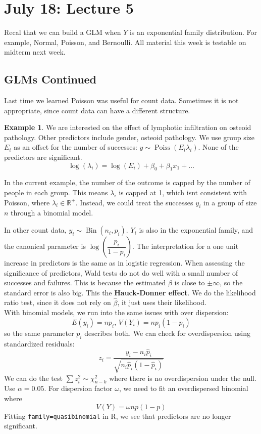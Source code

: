 \documentclass[12pt, a4paper]{article}
\theoremstyle{definition}
\newtheorem{example}{Example}
\newcommand{\R}{\mathbb{R}}                           %
\newcommand{\lam}{\lambda}
\newcommand{\f}{\frac}
\newcommand{\df}{\dfrac}
\newcommand{\BB}[1]{\left(#1\right)}
\newcommand{\op}[1]{\operatorname{#1}}
\begin{document}
	\section{July 18: Lecture 5}
	
	Recal that we can build a GLM when $Y$ is an exponential family distribution. For example, Normal, Poisson, and Bernoulli. All material this week is testable on midterm next week.
	
	\subsection{GLMs Continued}
	
	Last time we learned Poisson was useful for count data. Sometimes it is not appropriate, since count data can have a different structure.
	
	\begin{example}
		We are interested on the effect of lymphotic infiltration on osteoid pathology. Other predictors include gender, osteoid pathology. We use group size $E_i$ as an offset for the number of successes:  $y \sim \op{Poiss}(E_i\lam_i)$. None of the predictors are significant.\\
		$$
			\log(\lam_i) = \log(E_i) + \beta_0 + \beta_1x_1 + \ldots
		$$
		
		In the current example, the number of the outcome is capped by the number of people in each group. This means $\lam_i$ is capped at 1, which isnt consistent with Poisson, where $\lam_i \in \R^+$. Instead, we could treat the successes $y_i$ in a group of size $n$ through a binomial model.
	\end{example}

	In other count data, $y_i \sim \op{Bin}(n_i, p_i)$. $Y_i$ is also in the exponential family, and the canonical parameter is $\log\BB{\df{p_i}{1-p_i}}$. The interpretation for a one unit increase in predictors is the same as in logistic regression. 
	When assessing the significance of predictors, Wald tests do not do well with a small number of successes and failures. This is because the estimated $\beta$ is close to $\pm \infty$, so the standard error is also big. This the {\bf Hauck-Donner effect}. We do the likelihood ratio test, since it does not rely on $\hat\beta$, it just uses their likelihood.\\
	
	With binomial models, we run into the same issues with over dispersion:
	$$
		E(y_i) = np_i,\, V(Y_i) = np_i(1-p_i)
	$$
	so the same parameter $p_i$ describes both. We can check for overdispersion using standardized residuals:
	$$
		z_i = \f{y_i - n_i\hat p_i}{\sqrt{n_i\hat p_i (1- \hat p_i)}}
	$$ 
	We can do the test $\sum z_i^2 \sim \chi^2_{n-k}$ where  there is no overdispersion under the null. Use $\alpha = 0.05$. For dispersion factor $\omega$, we need to fit an overdispersed binomial where
	$$
		V(Y) = \omega np(1-p)
	$$
	Fitting \verb*|family=quasibinomial| in R, we see that predictors are no longer significant.\\
	
\end{document}
